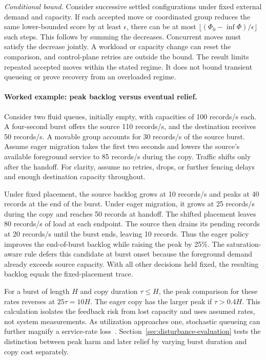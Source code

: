 \documentclass[manuscript]{acmart}
\begin{document}
\emph{Conditional bound.} Consider successive settled configurations under fixed external demand and capacity. If each accepted move or coordinated group reduces the same lower-bounded score by at least \(\epsilon\), there can be at most \(\lfloor(\Phi_0-\inf\Phi)/\epsilon\rfloor\) such steps. This follows by summing the decreases. Concurrent moves must satisfy the decrease jointly. A workload or capacity change can reset the comparison, and control-plane retries are outside the bound. The result limits repeated accepted moves within the stated regime. It does not bound transient queueing or prove recovery from an overloaded regime.

\paragraph{Worked example: peak backlog versus eventual relief.}
Consider two fluid queues, initially empty, with capacities of 100 records/s each. A four-second burst offers the source 110 records/s, and the destination receives 50 records/s. A movable group accounts for 30 records/s of the source burst. Assume eager migration takes the first two seconds and lowers the source's available foreground service to 85 records/s during the copy. Traffic shifts only after the handoff. For clarity, assume no retries, drops, or further fencing delays and enough destination capacity throughout.

Under fixed placement, the source backlog grows at 10 records/s and peaks at 40 records at the end of the burst. Under eager migration, it grows at 25 records/s during the copy and reaches 50 records at handoff. The shifted placement leaves 80 records/s of load at each endpoint. The source then drains its pending records at 20 records/s until the burst ends, leaving 10 records. Thus the eager policy improves the end-of-burst backlog while raising the peak by 25\%. The saturation-aware rule defers this candidate at burst onset because the foreground demand already exceeds source capacity. With all other decisions held fixed, the resulting backlog equals the fixed-placement trace.

For a burst of length \(H\) and copy duration \(\tau\le H\), the peak comparison for these rates reverses at \(25\tau=10H\). The eager copy has the larger peak if \(\tau>0.4H\). This calculation isolates the feedback risk from lost capacity and uses assumed rates, not system measurements. As utilization approaches one, stochastic queueing can further magnify a service-rate loss~\cite{kingman1961single}. Section~\ref{sec:disturbance-evaluation} tests the distinction between peak harm and later relief by varying burst duration and copy cost separately.
\end{document}
